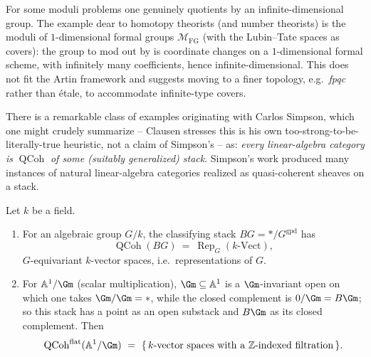 \begin{example}
\label{ex:15:formal-groups}
For some moduli problems one genuinely quotients by an infinite-dimensional group.
The example dear to homotopy theorists (and number theorists) is the moduli of
$1$-dimensional formal groups $\mathcal{M}_{\mathrm{FG}}$ (with the Lubin--Tate
spaces as covers): the group to mod out by is coordinate changes on a
$1$-dimensional formal scheme, with infinitely many coefficients, hence
infinite-dimensional. This does not fit the Artin framework and suggests moving to a
finer topology, e.g.\ \emph{fpqc} rather than \'etale, to accommodate infinite-type
covers.
\end{example}

\begin{remark}
\label{rmk:15:simpson}
There is a remarkable class of examples originating with Carlos Simpson, which one
might crudely summarize -- Clausen stresses this is his own too-strong-to-be-literally-true
heuristic, not a claim of Simpson's -- as: \emph{every linear-algebra category is}
$\operatorname{QCoh}$ \emph{of some (suitably generalized) stack}. Simpson's work
produced many instances of natural linear-algebra categories realized as
quasi-coherent sheaves on a stack.
\end{remark}

\begin{example}
\label{ex:15:simpson-stacks}
Let $k$ be a field.
\begin{enumerate}
\item For an algebraic group $G/k$, the classifying stack $BG = \ast/G^{\mathrm{gpd}}$
has
\begin{equation*}
\operatorname{QCoh}(BG)\ =\ \operatorname{Rep}_G(k\text{-}\mathrm{Vect}),
\end{equation*}
$G$-equivariant $k$-vector spaces, i.e.\ representations of $G$.
\item For $\mathbb{A}^1/\Gm$ (scalar multiplication), $\Gm\subseteq\mathbb{A}^1$ is a
$\Gm$-invariant open on which one takes $\Gm/\Gm = \ast$, while the closed complement
is $0/\Gm = B\Gm$; so this stack has a point as an open substack and $B\Gm$ as its
closed complement. Then
\begin{equation*}
\operatorname{QCoh}^{\mathrm{flat}}(\mathbb{A}^1/\Gm)\ =\ \{\,\text{$k$-vector spaces with a $\mathbb{Z}$-indexed filtration}\,\}.
\end{equation*}
\end{enumerate}
\end{example}

